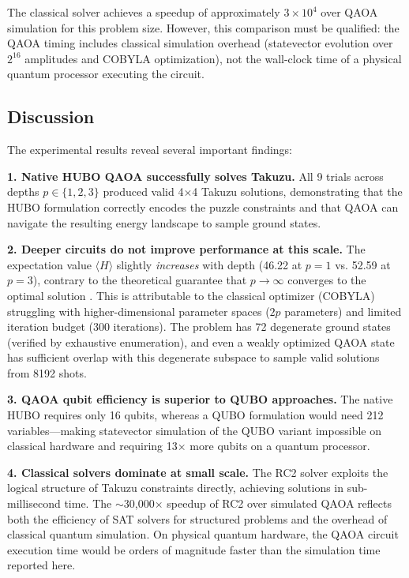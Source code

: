 \documentclass[eng]{ajceam-class}
\begin{document}
The classical solver achieves a speedup of approximately $3 \times 10^4$ over QAOA simulation for this problem size. However, this comparison must be qualified: the QAOA timing includes classical simulation overhead (statevector evolution over $2^{16}$ amplitudes and COBYLA optimization), not the wall-clock time of a physical quantum processor executing the circuit.

\subsection{Discussion}

The experimental results reveal several important findings:

\textbf{1. Native HUBO QAOA successfully solves Takuzu.} All 9 trials across depths $p \in \{1, 2, 3\}$ produced valid 4$\times$4 Takuzu solutions, demonstrating that the HUBO formulation correctly encodes the puzzle constraints and that QAOA can navigate the resulting energy landscape to sample ground states.

\textbf{2. Deeper circuits do not improve performance at this scale.} The expectation value $\langle H \rangle$ slightly \emph{increases} with depth (46.22 at $p=1$ vs. 52.59 at $p=3$), contrary to the theoretical guarantee that $p \rightarrow \infty$ converges to the optimal solution \cite{farhi2014qaoa}. This is attributable to the classical optimizer (COBYLA) struggling with higher-dimensional parameter spaces ($2p$ parameters) and limited iteration budget (300 iterations). The problem has 72 degenerate ground states (verified by exhaustive enumeration), and even a weakly optimized QAOA state has sufficient overlap with this degenerate subspace to sample valid solutions from 8192 shots.

\textbf{3. QAOA qubit efficiency is superior to QUBO approaches.} The native HUBO requires only 16 qubits, whereas a QUBO formulation would need 212 variables---making statevector simulation of the QUBO variant impossible on classical hardware and requiring 13$\times$ more qubits on a quantum processor.

\textbf{4. Classical solvers dominate at small scale.} The RC2 solver exploits the logical structure of Takuzu constraints directly, achieving solutions in sub-millisecond time. The $\sim$30,000$\times$ speedup of RC2 over simulated QAOA reflects both the efficiency of SAT solvers for structured problems and the overhead of classical quantum simulation. On physical quantum hardware, the QAOA circuit execution time would be orders of magnitude faster than the simulation time reported here.
\end{document}
